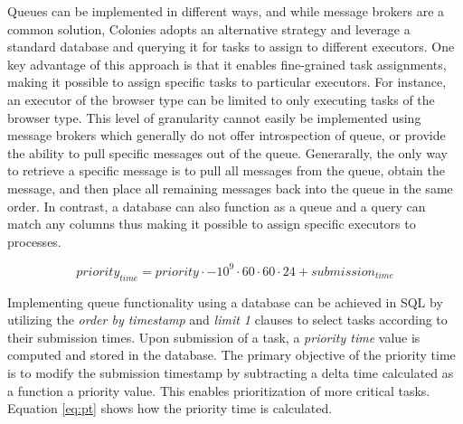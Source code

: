 \documentclass{article}
\begin{document}
Queues can be implemented in different ways, and while message brokers are a common solution, Colonies adopts an alternative strategy and leverage a standard database and querying it for tasks to assign to different executors. One key advantage of this approach is that it enables fine-grained task assignments, making it possible to assign specific tasks to particular executors. For instance, an executor of the browser type can be limited to only executing tasks of the browser type. This level of granularity cannot easily be implemented using message brokers which generally do not offer introspection of queue, or provide the ability to pull specific messages out of the queue. Generarally, the only way to retrieve a specific message is to pull all messages from the queue, obtain the message, and then place all remaining messages back into the queue in the same order. In contrast, a database can also function as a queue and a query can match any columns thus making it possible to assign specific executors to processes.

\begin{equation}
    \label{eq:pt}
    priority_{time}=priority \cdot -10^9 \cdot 60 \cdot 60 \cdot 24 + submission_{time}  
\end{equation}

Implementing queue functionality using a database can be achieved in SQL by utilizing the \emph{order by timestamp} and \emph{limit 1} clauses to select tasks according to their submission times. Upon submission of a task, a \emph{priority time} value is computed and stored in the database. The primary objective of the priority time is to modify the submission timestamp by subtracting a delta time calculated as a function a priority value. This enables prioritization of more critical tasks. Equation \ref{eq:pt} shows how the priority time is calculated. 
\end{document}
